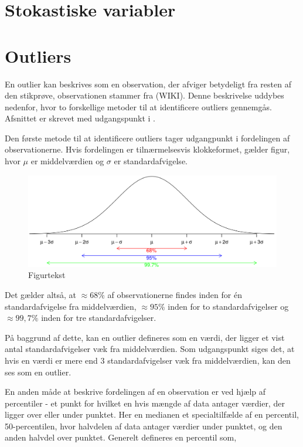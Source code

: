 \documentclass[]{book}
\theoremstyle{definition}
\theoremstyle{definition}
\theoremstyle{definition}
\theoremstyle{remark}
\begin{document}
\hypertarget{stokastiske-variabler}{%
\section{Stokastiske variabler}\label{stokastiske-variabler}}

\hypertarget{outliers}{%
\section{Outliers}\label{outliers}}

En outlier kan beskrives som en observation, der afviger betydeligt fra resten af den stikprøve, observationen stammer fra (WIKI). Denne beskrivelse uddybes nedenfor, hvor to forskellige metoder til at identificere outliers gennemgås. Afsnittet er skrevet med udgangspunkt i \citep[s. 48-55]{ASTAbog}.

Den første metode til at identificere outliers tager udgangpunkt i fordelingen af observationerne. Hvis fordelingen er tilnærmelsesvis klokkeformet, gælder figur, hvor \(\mu\) er middelværdien og \(\sigma\) er standardafvigelse.

\begin{figure}

{\centering \includegraphics[width=0.75\linewidth]{images/Normalfordeling} 

}

\caption{Figurtekst}\label{fig:unnamed-chunk-2}
\end{figure}

Det gælder altså, at \(\approx 68 \%\) af observationerne findes inden for én standardafvigelse fra middelværdien, \(\approx 95 \%\) inden for to standardafvigelser og \(\approx 99,7 \%\) inden for tre standardafvigelser.

På baggrund af dette, kan en outlier defineres som en værdi, der ligger et vist antal standardafvigelser væk fra middelværdien. Som udgangspunkt siges det, at hvis en værdi er mere end \(3\) standardafvigelser væk fra middelværdien, kan den ses som en outlier.

En anden måde at beskrive fordelingen af en observation er ved hjælp af percentiler - et punkt for hvilket en hvis mængde af data antager værdier, der ligger over eller under punktet. Her en medianen et specialtilfælde af en percentil, 50-percentilen, hvor halvdelen af data antager værdier under punktet, og den anden halvdel over punktet. Generelt defineres en percentil som,
\end{document}
